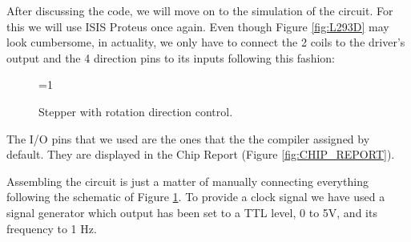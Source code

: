After discussing the code, we will move on to the simulation of the circuit. For this we will use ISIS Proteus once again. Even though Figure \ref{fig:L293D} may look cumbersome, in actuality, we only have to connect the 2 coils to the driver's output and the 4 direction pins to its inputs following this fashion:\medskip

\begin{figure}[H]
    \centering
    
    \ifnum\value{ANIMATION}=1 {
    } 
    \fi
    
    \caption{Stepper with rotation direction control.}
    \label{fig:STEPPER_ROTATION}
\end{figure}

The I/O pins that we used are the ones that the the compiler assigned by default. They are displayed in the Chip Report (Figure \ref{fig:CHIP_REPORT}).\medskip

Assembling the circuit is just a matter of manually connecting everything following the schematic of Figure \ref{fig:STEPPER_ROTATION}. To provide a clock signal we have used a signal generator which output has been set to a TTL level, 0 to 5V, and its frequency to 1 Hz.  

\clearpage